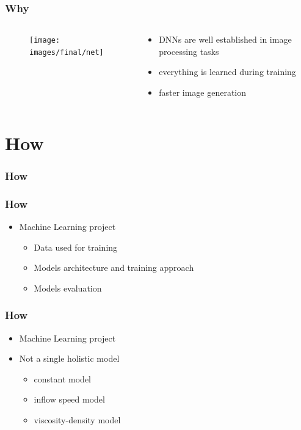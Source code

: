 \documentclass[18pt]{beamer}
\begin{document}
\begin{frame}
  \frametitle{Why}

  \begin{columns}[t]
    \begin{column}{0.5\textwidth}

      \vspace{-0.5cm}
      \begin{center}
        \begin{figure}[htb]
          \texttt{[image: images/final/net]}
        \end{figure}
      \end{center}
      
    \end{column}
    \begin{column}{0.5\textwidth}
      \begin{itemize}
      \item DNNs are well established in image processing tasks
      \item everything is learned during training
      \item faster image generation
      \end{itemize}
    \end{column}
  \end{columns}  
\end{frame}


\section{How}

\begin{frame}[t]
  \frametitle{How}
\end{frame}

\begin{frame}[t]
  \frametitle{How}
  \begin{itemize}
  \item Machine Learning project
    \begin{itemize}
    \item Data used for training
    \item Models architecture and training approach
    \item Models evaluation
    \end{itemize}
  \end{itemize}
\end{frame}

\begin{frame}[t]
  \frametitle{How}
  \begin{itemize}
  \item Machine Learning project
  \item Not a single holistic model    
  \begin{itemize}
    \item constant model
    \item inflow speed model
    \item viscosity-density model
    \end{itemize}  
  \end{itemize}
\end{frame}
\end{document}
